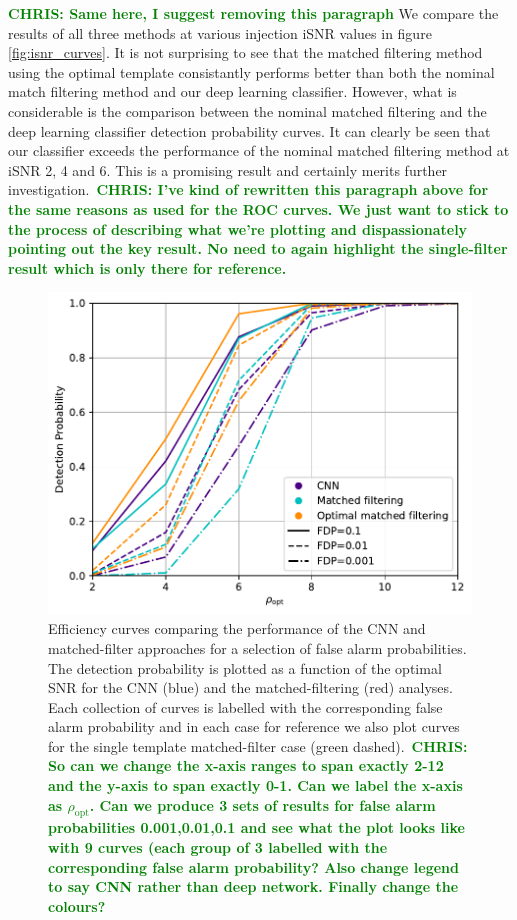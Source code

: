 \documentclass[%
showpacs,
 amsmath,amssymb,
 aps,
 twocolumn,
 prl,
 reprint,
floatfix,
]{revtex4-1}
\newcommand{\optsnr}{\rho_{\mathrm{opt}}}
\newcommand{\chris}[1]{\textbf{\textcolor{green}{CHRIS: #1}}}
\begin{document}
\chris{Same here, I suggest removing this paragraph} We compare the results of
all three methods at various injection iSNR values in figure
\ref{fig:isnr_curves}. It is not surprising to see that the matched filtering
method using the optimal template consistantly performs better than both the
nominal match filtering method and our deep learning classifier.  However, what
is considerable is the comparison between the nominal matched filtering and the
deep learning classifier detection probability curves. It can clearly be seen
that our classifier exceeds the performance of the nominal matched filtering
method at iSNR 2, 4 and 6. This is a promising result and certainly merits
further investigation.~\chris{I've kind of rewritten this paragraph above for
the same reasons as used for the ROC curves. We just want to stick to the
process of describing what we're plotting and dispassionately pointing out the
key result. No need to again highlight the single-filter result which is only
there for reference.}  

%
%
\begin{figure}[]
\includegraphics[width=\columnwidth] {figures/efficiency.pdf}
\caption{Efficiency curves comparing the performance of the \ac{CNN} and
matched-filter approaches for a selection of false alarm probabilities. The
detection probability is plotted as a function of the optimal \ac{SNR} for the 
\ac{CNN} (blue) and the matched-filtering (red) analyses. Each collection of
curves is labelled with the corresponding false alarm probability and in each
case for reference we also plot curves for the single template matched-filter
case (green dashed).~\chris{So can we change the x-axis ranges to span exactly 2-12
and the y-axis to span exactly 0-1. Can we label the x-axis as $\optsnr$. Can
we produce 3 sets of results for false alarm probabilities 0.001,0.01,0.1 and
see what the plot looks like with 9 curves (each group of 3 labelled with the
corresponding false alarm probability? Also change legend to say CNN rather
than deep network. Finally change the colours?}\label{fig:efficiency_curve}}
\end{figure}
\end{document}
